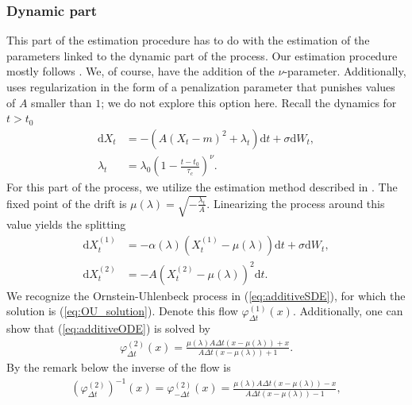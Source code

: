 \subsubsection{Dynamic part}\label{subsubsec:OUprocessDynamic}
This part of the estimation procedure has to do with the estimation of the parameters linked to the dynamic part of the process. Our estimation procedure mostly follows \cite{Ditlevsen2023}. We, of course, have the addition of the $\nu$-parameter. Additionally, \cite{Ditlevsen2023} uses regularization in the form of a penalization parameter that punishes values of $A$ smaller than $1$; we do not explore this option here. Recall the dynamics for $t>t_0$
\begin{align}
    \mathrm{d}X_t &= -\left(A\left(X_t - m\right)^2 + \lambda_t\right)\mathrm{d}t + \sigma \mathrm{d}W_t \label{eq:additiveDynamicPart},\\
    \lambda_t &= \lambda_0\left(1 - \frac{t - t_0}{\tau_c}\right)^\nu.
\end{align}
For this part of the process, we utilize the estimation method described in \cite{DitlevsenSupplementary}. The fixed point of the drift is $\mu\left(\lambda\right) = \sqrt{-\frac{\lambda_t}{A}}$. Linearizing the process around this value yields the splitting
\begin{align}
    \mathrm{d}X_t^{(1)} &= -\alpha\left(\lambda\right)\left(X_t^{(1)} - \mu\left(\lambda\right)\right)\mathrm{d}t + \sigma \mathrm{d}W_t, \label{eq:additiveSDE}\\
    \mathrm{d}X_t^{(2)} &= -A \left(X_t^{(2)} - \mu\left(\lambda\right)\right)^2\mathrm{d}t. \label{eq:additiveODE}
\end{align}
We recognize the Ornstein-Uhlenbeck process in (\ref{eq:additiveSDE}), for which the solution is (\ref{eq:OU_solution}). Denote this flow $\varphi_{\Delta t}^{(1)}(x)$. Additionally, one can show that (\ref{eq:additiveODE}) is solved by 
\begin{align}
    \varphi^{(2)}_{\Delta t}(x) = \frac{\mu\left(\lambda\right)A\Delta t\left(x - \mu\left(\lambda\right)\right) + x}{A\Delta t\left(x- \mu\left(\lambda\right)\right) + 1}.
\end{align}
By the remark below \cite[equation (9)]{SplittingSchemes} the inverse of the flow is
\begin{align}
    \left(\varphi^{(2)}_{\Delta t}\right)^{-1}(x) = \varphi^{(2)}_{-\Delta t}(x) = \frac{\mu\left(\lambda\right)A\Delta t\left(x - \mu\left(\lambda\right)\right) - x}{A\Delta t\left(x- \mu\left(\lambda\right)\right) - 1},
\end{align}
